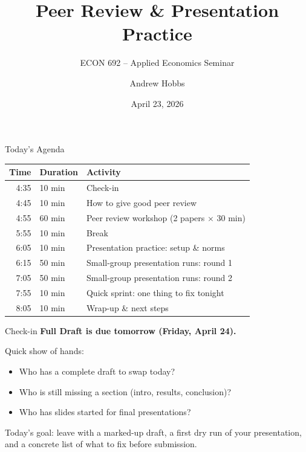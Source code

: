 

\title{Peer Review \& Presentation Practice}
\subtitle{ECON 692 -- Applied Economics Seminar}
\author{Andrew Hobbs}
\date{April 23, 2026}



\begin{frame}[plain]
  \titlepage
\end{frame}


\begin{frame}{Today's Agenda}
  \small
  \begin{tabular}{@{}r@{\hspace{8pt}}l@{\hspace{16pt}}l@{}}
    \toprule
    \textbf{Time} & \textbf{Duration} & \textbf{Activity} \\
    \midrule
    4:35 & 10 min & Check-in \\
    4:45 & 10 min & How to give good peer review \\
    4:55 & 60 min & Peer review workshop (2 papers $\times$ 30 min) \\
    5:55 & 10 min & Break \\
    6:05 & 10 min & Presentation practice: setup \& norms \\
    6:15 & 50 min & Small-group presentation runs: round 1 \\
    7:05 & 50 min & Small-group presentation runs: round 2 \\
    7:55 & 10 min & Quick sprint: one thing to fix tonight \\
    8:05 & 10 min & Wrap-up \& next steps \\
    \bottomrule
  \end{tabular}
\end{frame}

\begin{frame}{Check-in}
  \textbf{\textcolor{usfgreen}{Full Draft is due tomorrow (Friday, April 24).}}

  \vspace{8pt}

  Quick show of hands:

  \vspace{4pt}

  \begin{itemize}
    \item Who has a complete draft to swap today?
    \item Who is still missing a section (intro, results, conclusion)?
    \item Who has slides started for final presentations?
  \end{itemize}

  \vspace{8pt}

  Today's goal: leave with a marked-up draft, a first dry run of your presentation, and a concrete list of what to fix before submission.
\end{frame}

